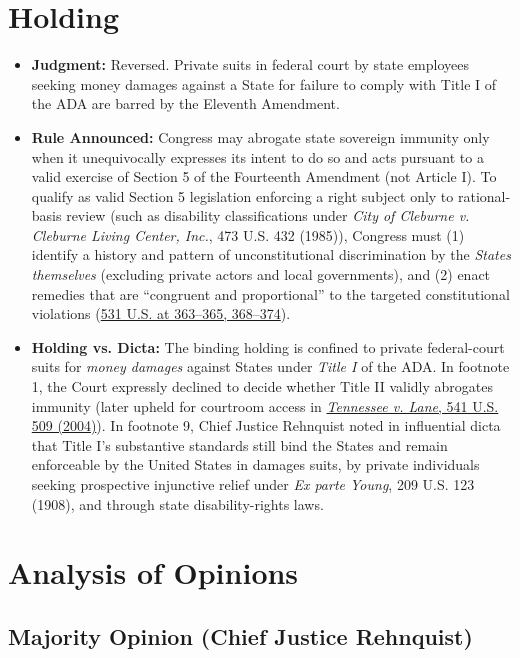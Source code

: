 \documentclass[12pt]{article}
\begin{document}
\section{Holding}

\begin{itemize}
\item \textbf{Judgment:} Reversed. Private suits in federal court by state employees seeking money damages against a State for failure to comply with Title I of the ADA are barred by the Eleventh Amendment.
\item \textbf{Rule Announced:} Congress may abrogate state sovereign immunity only when it unequivocally expresses its intent to do so and acts pursuant to a valid exercise of Section 5 of the Fourteenth Amendment (not Article I). To qualify as valid Section 5 legislation enforcing a right subject only to rational-basis review (such as disability classifications under \textit{City of Cleburne v. Cleburne Living Center, Inc.}, 473 U.S. 432 (1985)), Congress must (1) identify a history and pattern of unconstitutional discrimination by the \textit{States themselves} (excluding private actors and local governments), and (2) enact remedies that are ``congruent and proportional'' to the targeted constitutional violations (\href{https://supreme.justia.com/cases/federal/us/531/356/}{531 U.S. at 363--365, 368--374}).
\item \textbf{Holding vs. Dicta:} The binding holding is confined to private federal-court suits for \textit{money damages} against States under \textit{Title I} of the ADA. In footnote 1, the Court expressly declined to decide whether Title II validly abrogates immunity (later upheld for courtroom access in \href{https://supreme.justia.com/cases/federal/us/541/509/}{\textit{Tennessee v. Lane}, 541 U.S. 509 (2004)}). In footnote 9, Chief Justice Rehnquist noted in influential dicta that Title I's substantive standards still bind the States and remain enforceable by the United States in damages suits, by private individuals seeking prospective injunctive relief under \textit{Ex parte Young}, 209 U.S. 123 (1908), and through state disability-rights laws.
\end{itemize}

\section{Analysis of Opinions}

\subsection{Majority Opinion (Chief Justice Rehnquist)}
\end{document}
